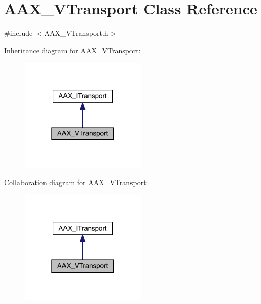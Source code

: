 \hypertarget{a01941}{}\section{A\+A\+X\+\_\+\+V\+Transport Class Reference}
\label{a01941}


{\ttfamily \#include $<$A\+A\+X\+\_\+\+V\+Transport.\+h$>$}



Inheritance diagram for A\+A\+X\+\_\+\+V\+Transport\+:
\nopagebreak
\begin{figure}[H]
\begin{center}
\leavevmode
\includegraphics[width=171pt]{a01940}
\end{center}
\end{figure}


Collaboration diagram for A\+A\+X\+\_\+\+V\+Transport\+:
\nopagebreak
\begin{figure}[H]
\begin{center}
\leavevmode
\includegraphics[width=171pt]{a01939}
\end{center}
\end{figure}


